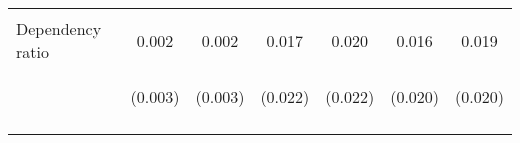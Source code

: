 \begin{center}
\begin{tabular}{lcccccc}
\vspace{4pt} & \begin{footnotesize}[0.186]\end{footnotesize} & \begin{footnotesize}[0.143]\end{footnotesize} & \begin{footnotesize}[0.755]\end{footnotesize} & \begin{footnotesize}[0.661]\end{footnotesize} & \begin{footnotesize}[0.827]\end{footnotesize} & \begin{footnotesize}[0.730]\end{footnotesize} \\
Dependency ratio & 0.002 & 0.002 & 0.017 & 0.020 & 0.016 & 0.019 \\
 & \begin{footnotesize}(0.003)\end{footnotesize} & \begin{footnotesize}(0.003)\end{footnotesize} & \begin{footnotesize}(0.022)\end{footnotesize} & \begin{footnotesize}(0.022)\end{footnotesize} & \begin{footnotesize}(0.020)\end{footnotesize} & \begin{footnotesize}(0.020)\end{footnotesize} \\
\vspace{4pt} & \begin{footnotesize}[0.509]\end{footnotesize} & \begin{footnotesize}[0.457]\end{footnotesize} & \begin{footnotesize}[0.430]\end{footnotesize} & \begin{footnotesize}[0.365]\end{footnotesize} & \begin{footnotesize}[0.420]\end{footnotesize} & \begin{footnotesize}[0.355]\end{footnotesize} \\

\end{tabular}
\end{center}
